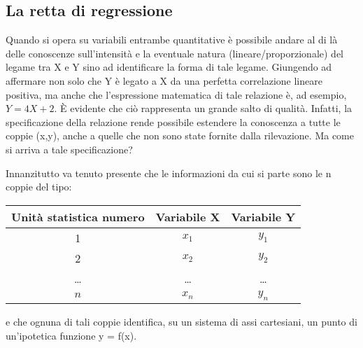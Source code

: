 \subsection{La retta di regressione}
 Quando si opera su variabili entrambe quantitative è possibile andare al 
di là delle conoscenze sull'intensità e la eventuale natura 
(lineare/proporzionale) del legame tra X e Y sino ad identificare la forma 
di tale legame. Giungendo ad affermare non solo che Y è legato a X da una 
perfetta correlazione lineare positiva, ma anche che l'espressione 
matematica di tale relazione è, ad esempio, $Y=4 X +2$.
 È evidente che ciò rappresenta un grande salto di qualità. Infatti, la 
specificazione della relazione rende possibile estendere la conoscenza a 
tutte le coppie (x,y), anche a quelle che non sono state fornite dalla 
rilevazione.
 Ma come si arriva a tale specificazione?
 
 Innanzitutto va tenuto presente che le informazioni da cui si parte sono 
le n coppie del tipo:

 \begin{tabular}{|c|c|c|}
        \hline
        Unità statistica numero &       Variabile X&    Variabile Y\\\hline
        1&      $x_1$&  $y_1$\\\hline
        2&      $x_2$&  $y_2$\\\hline
        \dots&  \dots&\dots\\\hline
        $n$&    $x_n$&  $y_n$\\\hline
 \end{tabular}
 
\vspace{6pt}
 e che ognuna di tali coppie identifica, su un sistema di assi cartesiani, 
un punto di un'ipotetica funzione y = f(x).
 
